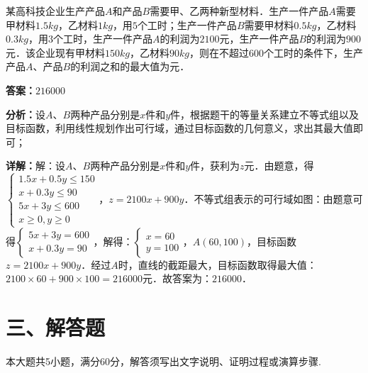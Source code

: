 \begin{question}[points=5]
某高科技企业生产产品$A$和产品$B$需要甲、乙两种新型材料．生产一件产品$A$需要甲材料$1.5kg$，乙材料$1kg$，用$5$个工时；生产一件产品$B$需要甲材料$0.5kg$，乙材料$0.3kg$，用$3$个工时，生产一件产品$A$的利润为$2100$元，生产一件产品$B$的利润为$900$元．该企业现有甲材料$150kg$，乙材料$90kg$，则在不超过$600$个工时的条件下，生产产品$A$、产品$B$的利润之和的最大值为元．
\fillin[{$216000$}]
\begin{solution}
\textbf{答案：}$216000$

\textbf{分析：}设$A$、$B$两种产品分别是$x$件和$y$件，根据题干的等量关系建立不等式组以及目标函数，利用线性规划作出可行域，通过目标函数的几何意义，求出其最大值即可；

\textbf{详解：}解：设$A$、$B$两种产品分别是$x$件和$y$件，获利为$z$元．由题意，得$\begin{cases}1.5x+0.5y\le150\\x+0.3y\le90\\5x+3y\le600\\x\ge0,y\ge0\end{cases}$，$z=2100x+900y$．不等式组表示的可行域如图：由题意可得$\begin{cases}5x+3y=600\\x+0.3y=90\end{cases}$，解得：$\begin{cases}x=60\\y=100\end{cases}$，$A(60,100)$，目标函数$z=2100x+900y$．经过$A$时，直线的截距最大，目标函数取得最大值：$2100\times60+900\times100=216000$元．故答案为：$216000$．
\end{solution}
\end{question}

\section*{三、解答题}
本大题共5小题，满分60分，解答须写出文字说明、证明过程或演算步骤.

